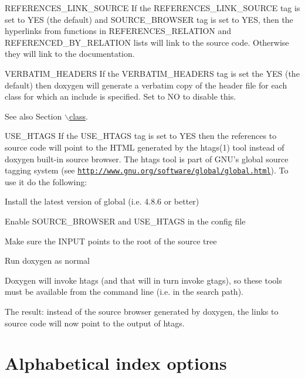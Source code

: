 \begin{DoxyDescription}
\item[{\ttfamily REFERENCES\_\-LINK\_\-SOURCE} ] If the {\ttfamily REFERENCES\_\-LINK\_\-SOURCE} tag is set to {\ttfamily YES} (the default) and SOURCE\_\-BROWSER tag is set to {\ttfamily YES}, then the hyperlinks from functions in REFERENCES\_\-RELATION and REFERENCED\_\-BY\_\-RELATION lists will link to the source code. Otherwise they will link to the documentation.

\label{config_cfg_verbatim_headers}
\hypertarget{config_cfg_verbatim_headers}{}
 
\item[{\ttfamily VERBATIM\_\-HEADERS} ] If the {\ttfamily VERBATIM\_\-HEADERS} tag is set the {\ttfamily YES} (the default) then doxygen will generate a verbatim copy of the header file for each class for which an include is specified. Set to NO to disable this. \begin{DoxySeeAlso}{See also}
Section \hyperlink{commands_cmdclass}{$\backslash$class}.
\end{DoxySeeAlso}
\label{config_cfg_use_htags}
\hypertarget{config_cfg_use_htags}{}
 
\item[{\ttfamily USE\_\-HTAGS} ] If the {\ttfamily USE\_\-HTAGS} tag is set to {\ttfamily YES} then the references to source code will point to the HTML generated by the htags(1) tool instead of doxygen built-\/in source browser. The htags tool is part of GNU's global source tagging system (see \href{http://www.gnu.org/software/global/global.html}{\tt http://www.gnu.org/software/global/global.html}). To use it do the following:


\begin{DoxyEnumerate}
\item Install the latest version of global (i.e. 4.8.6 or better)
\item Enable SOURCE\_\-BROWSER and USE\_\-HTAGS in the config file
\item Make sure the INPUT points to the root of the source tree
\item Run doxygen as normal
\end{DoxyEnumerate}

Doxygen will invoke htags (and that will in turn invoke gtags), so these tools must be available from the command line (i.e. in the search path).

The result: instead of the source browser generated by doxygen, the links to source code will now point to the output of htags.


\end{DoxyDescription}\hypertarget{config_alphabetical_index}{}\section{Alphabetical index options}\label{config_alphabetical_index}
\label{config_cfg_alphabetical_index}
\hypertarget{config_cfg_alphabetical_index}{}
 
